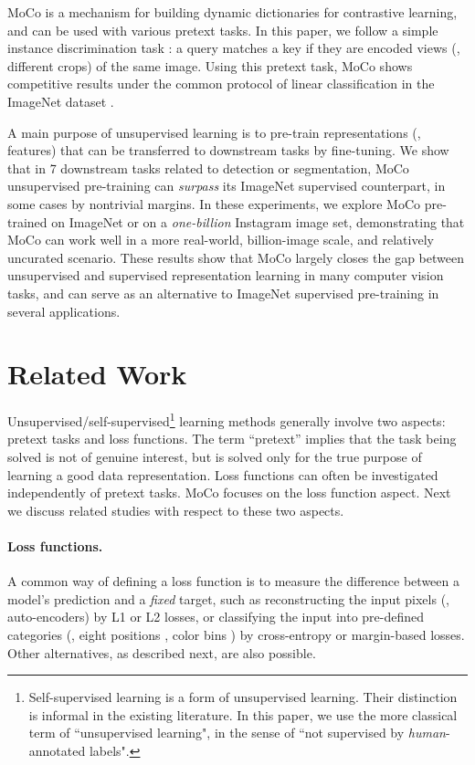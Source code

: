 \documentclass[10pt,twocolumn,letterpaper]{article}
\begin{document}
MoCo is a mechanism for building dynamic dictionaries for contrastive learning, and can be used with various pretext tasks. In this paper, we follow a simple instance discrimination task \cite{Wu2018a,Ye2019,Bachman2019}: a query matches a key if they are encoded views (\eg, different crops) of the same image.
Using this pretext task, MoCo shows competitive results under the common protocol of linear classification in the ImageNet dataset \cite{Deng2009}.

A main purpose of unsupervised learning is to pre-train representations (\ie, features) that can be transferred to downstream tasks by fine-tuning. We show that in 7 downstream tasks related to detection or segmentation, MoCo unsupervised pre-training can \emph{surpass} its ImageNet supervised counterpart, in some cases by nontrivial margins. In these experiments, we explore MoCo pre-trained on ImageNet or on a \emph{one-billion} \mbox{Instagram} image set, demonstrating that MoCo can work well in a more real-world, billion-image scale, and relatively uncurated scenario.
These results show that MoCo largely closes the gap between unsupervised and supervised representation learning in many computer vision tasks, and can serve as an alternative to ImageNet supervised pre-training in several applications.

\section{Related Work}

Unsupervised/self-supervised\footnote{Self-supervised learning is a form of unsupervised learning. Their distinction is informal in the existing literature. In this paper, we use the more classical term of ``unsupervised learning", in the sense of ``not supervised by \emph{human}-annotated labels".} learning methods generally involve two aspects: pretext tasks and loss functions.
The term ``pretext'' implies that the task being solved is not of genuine interest, but is solved only for the true purpose of learning a good data representation.
Loss functions can often be investigated independently of pretext tasks.
MoCo focuses on the loss function aspect. Next we discuss related studies with respect to these two aspects.

\paragraph{Loss functions.} A common way of defining a loss function is to measure the difference between a model's prediction and a \emph{fixed} target, such as reconstructing the input pixels (\eg, auto-encoders) by L1 or L2 losses, or classifying the input into pre-defined categories (\eg, eight positions \cite{Doersch2015}, color bins \cite{Zhang2016}) by cross-entropy or margin-based losses.
Other alternatives, as described next, are also possible.
\end{document}
